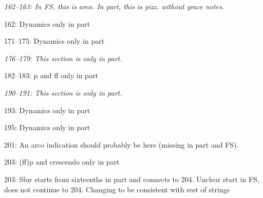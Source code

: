\documentclass[twoside]{article}
\begin{document}
\begin{hangparas}{15pt}{1}
\begin{multicols}{2}
\textit{162--163: In FS, this is arco. In part, this is pizz. without grace notes.}

162: Dynamics only in part

171--175: Dynamics only in part

\textit{176--179: This section is only in part.}

182--183: p and ff only in part

\textit{190--191: This section is only in part.}

193: Dynamics only in part

195: Dynamics only in part

201: An arco indication should probably be here (missing in part and FS).

203: (ff)p and crescendo only in part

203: Slur starts from sixteenths in part and connects to 204. Unclear start in FS, does not continue to 204. Changing to be consistent with rest of strings

\end{multicols}

\end{hangparas}
\end{document}
